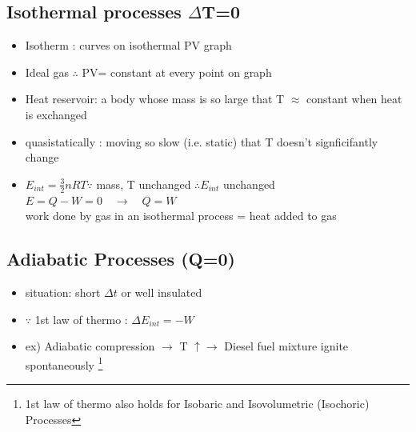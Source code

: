 \documentclass[12 pt , twoside, letterpaper] {article}
\begin{document}
		\subsection{Isothermal processes $\Delta $T=0}
		\begin{itemize}
		\item Isotherm : curves on isothermal PV graph
		\item Ideal gas $\therefore$ PV= constant at every point on graph 
		\item Heat reservoir: a body whose mass is so large that T $\approx$ constant when heat is exchanged
		\item quasistatically : moving so slow (i.e. static) that T doesn't signficifantly change 
		\item $E_{int}=\frac{3}{2}nRT \because$ mass, T unchanged $\therefore E_{int}$ unchanged
		\\ $E=Q - W=0 \quad \rightarrow \quad Q=W$
		\\ work done by gas in an isothermal process = heat added to gas
		\end{itemize}
		\subsection{Adiabatic Processes (Q=0)}
			\begin{itemize}
				\item situation: short $\Delta t$ or well insulated 
				\item $\because$ 1st law of thermo : $\Delta E_{int} = - W$ 
				\item ex) Adiabatic compression $\rightarrow$ T $\uparrow \rightarrow$ Diesel fuel mixture ignite spontaneously \footnote{1st law of thermo also holds for Isobaric and Isovolumetric (Isochoric) Processes }
			\end{itemize}
			
\end{document}

